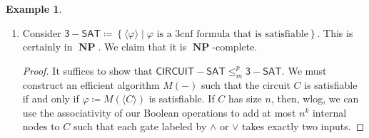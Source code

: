 \documentclass[10pt,letterpaper,cm]{nupset}
\theoremstyle{definition}
\newtheorem{exmp}[definition]{Example}
\theoremstyle{theorem}
\theoremstyle{remark}
\newcommand{\1}{\mathbf{1}}
\newcommand{\0}{\vec 0}
\DeclareMathOperator{\NP}{\mathbf{NP}}
\begin{document}
\begin{exmp} $ $
\begin{enumerate}
\item Consider $\mathsf{3{-}SAT}\coloneqq \left\{\langle \varphi \rangle \mid \varphi\text{ is a 3cnf formula that is satisfiable}\right\}$. This is certainly in $\NP$. We claim that it is $\NP$-complete.
\begin{proof}
It suffices to show that $\mathsf{CIRCUIT{-}SAT} \leq_m^p \mathsf{3{-}SAT}$. We must construct an efficient algorithm $M( -)$ such that the circuit $C$ is satisfiable  if and only if $\varphi\coloneqq M(\langle C \rangle)$ is satisfiable. If $C$ has size $n$, then, wlog, we can use the associativity of our Boolean operations to add at most $n^k$ internal nodes to $C$ such that each gate labeled by $\land$ or $\vee$ takes exactly two inputs. 


\end{proof}
\end{enumerate}
\end{exmp}
\end{document}
